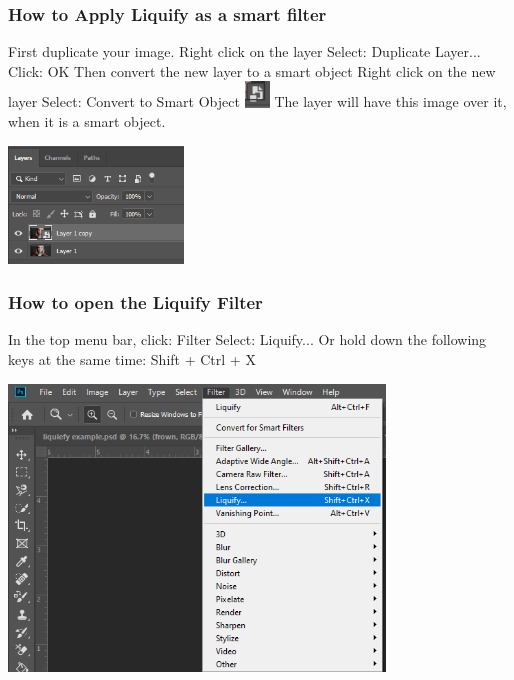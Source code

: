 \documentclass{beamer}
\begin{document}
	\begin{frame}
		\frametitle{How to Apply Liquify as a smart filter}
		\begin{outline}
			\1 First duplicate your image.
			\2 Right click on the layer
			\2 Select:  Duplicate Layer...
			\2 Click:  OK
			\1 Then convert the new layer to a smart object
			\2 Right click on the new layer
			\2 Select:  Convert to Smart Object
			\2 \includegraphics[width=0.05\textwidth]{images/smart object.png} The layer will have this image over it, when it is a smart object.
		\end{outline}
	\begin{center}
		\includegraphics[width=0.35\textwidth]{images/convert to smart object.png}
	\end{center}
	\end{frame}

	\begin{frame}
	\frametitle{How to open the Liquify Filter}
	\begin{outline}
		\1 In the top menu bar, click: Filter
		\2 Select:  Liquify...
		\1 Or hold down the following keys at the same time:
		\2 Shift + Ctrl + X
	\end{outline}
	\begin{center}
	\includegraphics[width=0.75\textwidth]{images/filter - liquify.png}
\end{center}
\end{frame}
\end{document}
